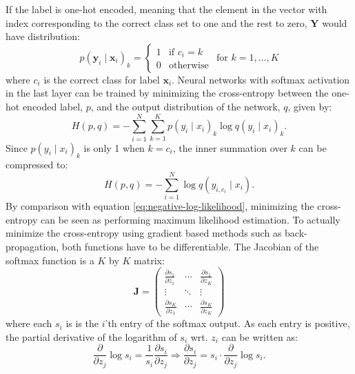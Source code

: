 \documentclass[a4paper,11pt]{article} %
\begin{document}
If the label is one-hot encoded, meaning that the element in the vector with index corresponding to the correct class set to one and the rest to zero, $\mathbf{Y}$ would have distribution:
\begin{equation}
  p(\mathbf{y}_i \mid \mathbf{x}_i)_k = \begin{cases}
    1 & \text{if } c_{i} = k \\
    0 & \text{otherwise}
  \end{cases} \hspace{5pt} \text{for } k = 1, \ldots, K
\end{equation}
where $c_i$ is the correct class for label $\mathbf{x}_i$. Neural networks with softmax activation in the last layer can be trained by minimizing the cross-entropy between the one-hot encoded label, $p$, and the output distribution of the network, $q$, given by:
\begin{equation}
  H(p, q) = - \sum_{i=1}^N \sum_{k=1}^K p(y_i \mid x_i)_k \log q(y_i \mid x_i)_k.
\end{equation}
Since $p(y_i \mid x_i)_k$ is only 1 when $k=c_i$, the inner summation over $k$ can be compressed to:
\begin{equation}
  H(p, q) = - \sum_{i=1}^N \log q(y_{i,c_i} \mid x_i).
\end{equation}
By comparison with equation \ref{eq:negative-log-likelihood}, minimizing the cross-entropy can be seen as performing maximum likelihood estimation. To actually minimize the cross-entropy using gradient based methods such as back-propagation, both functions have to be differentiable. The Jacobian of the softmax function is a $K$ by $K$ matrix:
\begin{equation}
  \mathbf{J} = \left( 
    \begin{matrix}
      \frac{\partial s_1}{\partial z_1} & \cdots & \frac{\partial s_1}{\partial z_K}\\
      \vdots & \ddots & \vdots \\
      \frac{\partial s_K}{\partial z_1} & \cdots & \frac{\partial s_K}{\partial z_K}
    \end{matrix} 
  \right)
\end{equation}
where each $s_i$ is is the $i$'th entry of the softmax output. As each entry is positive, the partial derivative of the logarithm of $s_i$ wrt. $z_i$ can be written as:
\begin{equation} \label{eq:softmax-derivative}
  \frac{\partial}{\partial z_j} \log s_i = \frac{1}{s_i} \frac{\partial s_i}{\partial z_j}
  \Rightarrow \frac{\partial s_i}{\partial z_j} = s_i \cdot \frac{\partial}{\partial z_j} \log s_i.
\end{equation}
\end{document}
